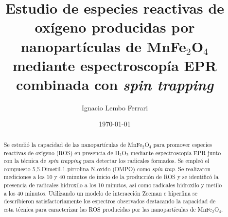 \documentclass[aps,prl,reprint,superscriptaddress,showkeys]{revtex4-2}
\begin{document}

\title{Estudio de especies reactivas de oxígeno producidas por nanopartículas de MnFe$_2$O$_4$ mediante espectroscopía EPR combinada con \textit{spin trapping}}


\author{Ignacio Lembo Ferrari}



\date{\today}

\begin{abstract}
Se estudió la capacidad de las nanopartículas de MnFe$_2$O$_4$ para promover especies reactivas de oxígeno (ROS) en presencia de H$_2$O$_2$ mediante espectroscopía EPR junto con la técnica de \textit{spin trapping} para detectar los radicales formados. Se empleó el compuesto 5,5-Dimetil-1-pirrolina N-oxido (DMPO) como \textit{spin trap}. Se realizaron mediciones a los 10 y 40 minutos de inicio de la producción de ROS y se identificó la presencia de radicales hidroxilo a los 10 minutos, así como radicales hidroxilo y metilo a los 40 minutos. Utilizando un modelo de interacción Zeeman e hiperfina se describieron satisfactoriamente los espectros observados destacando la capacidad de esta técnica para caracterizar las ROS producidas por las nanopartículas de MnFe$_2$O$_4$.

\end{abstract}
\end{document}
